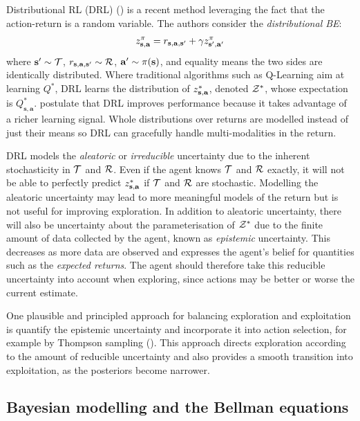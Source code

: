 \documentclass{article}
\begin{document}
Distributional RL (DRL) (\cite{distperrl}) is a recent method leveraging the fact that the action-return is a random variable. The authors consider the \textit{distributional BE}:
\begin{align} \label{eq:distributional}
z^\pi_{\mathbf{s}, \mathbf{a}} = r_{\mathbf{s}, \mathbf{a}, \mathbf{s}'} + \gamma z^\pi_{\mathbf{s}', \mathbf{a}'}
\end{align}
where $\mathbf{s}' \sim \mathcal{T}$, $r_{\mathbf{s}, \mathbf{a}, \mathbf{s}'} \sim \mathcal{R}$, $\mathbf{a}' \sim \pi(\mathbf{s})$, and equality means the two sides are identically distributed. Where traditional algorithms such as Q-Learning aim at learning $Q^*$, DRL learns the distribution of $z^*_{\mathbf{s}, \mathbf{a}}$, denoted $\mathcal{Z}^*$, whose expectation is $Q^*_{\mathbf{s}, \mathbf{a}}$. \cite{distperrl} postulate that DRL improves performance because it takes advantage of a richer learning signal. Whole distributions over returns are modelled instead of just their means so DRL can gracefully handle multi-modalities in the return.

DRL models the \textit{aleatoric} or \textit{irreducible} uncertainty due to the inherent stochasticity in $\mathcal{T}$ and $\mathcal{R}$. Even if the agent knows $\mathcal{T}$ and $\mathcal{R}$ exactly, it will not be able to perfectly predict $z^*_{\mathbf{s}, \mathbf{a}}$ if $\mathcal{T}$ and $\mathcal{R}$ are stochastic. Modelling the aleatoric uncertainty may lead to more meaningful models of the return but is not useful for improving exploration. In addition to aleatoric uncertainty, there will also be uncertainty about the parameterisation of $\mathcal{Z}^*$ due to the finite amount of data collected by the agent, known as \textit{epistemic} uncertainty. This decreases as more data are observed and expresses the agent's belief for quantities such as the \textit{expected returns}. The agent should therefore take this reducible uncertainty into account when exploring, since actions may be better or worse the current estimate.

One plausible and principled approach for balancing exploration and exploitation is quantify the epistemic uncertainty and incorporate it into action selection, for example by Thompson sampling (\cite{thompson}). This approach directs exploration according to the amount of reducible uncertainty and also provides a smooth transition into exploitation, as the posteriors become narrower. 

\subsection{Bayesian modelling and the Bellman equations}
\end{document}

